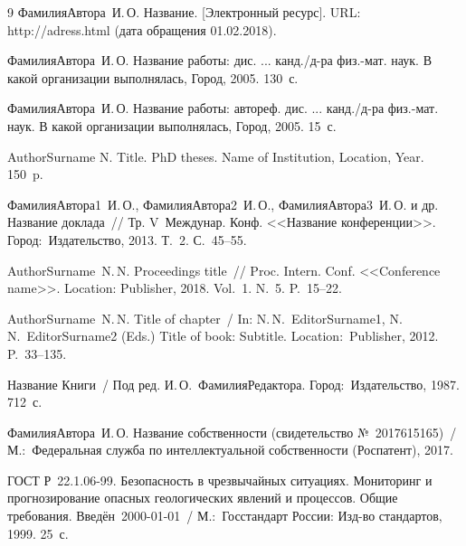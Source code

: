 \documentclass{YM_Likhanova}
\newcommand{\No}{№}
\begin{document}
{\begin{thebibliography}{9}
{\sc ФамилияАвтора~И.\,О.}
Название. [Электронный ресурс]. URL: http://adress.html (дата обращения 01.02.2018).
 
{\sc ФамилияАвтора~И.\,О.}
Название работы: дис. ... канд./д-ра физ.-мат. наук. В какой организации выполнялась, Город, 2005. 130~с.

{\sc ФамилияАвтора~И.\,О.}
Название работы: автореф. дис. ... канд./д-ра физ.-мат. наук. В какой организации выполнялась, Город, 2005. 15~с.

{\sc AuthorSurname N.}
Title. PhD theses. Name of Institution, Location, Year. 150~p.
 
{\sc ФамилияАвтора1~И.\,О., ФамилияАвтора2~И.\,О., ФамилияАвтора3~И.\,О. и др.}
Название доклада~// Тр. V~Междунар. Конф. <<Название конференции>>. Город:~Издательство, 2013. Т.~2. С.~45--55.
 
{\sc AuthorSurname~N.\,N.}
Proceedings title~// Proc. Intern. Conf. <<Conference name>>. Location: Publisher, 2018. Vol.~1. N.~5. P.~15--22.

{\sc AuthorSurname~N.\,N.}
Title of chapter~/ In: N.\,N.~EditorSurname1, N.\,N.~EditorSurname2 (Eds.) Title of book: Subtitle. Location:~Publisher, 2012. P.~33--135.

Название Книги~/ Под ред. И.\,О.~ФамилияРедактора. Город:~Издательство, 1987. 712~с. 

{\sc ФамилияАвтора~И.\,О.}
Название собственности (свидетельство \No~2017615165)~/ М.:~Федеральная служба по интеллектуальной собственности (Роспатент), 2017.

ГОСТ Р~22.1.06-99. Безопасность в чрезвычайных ситуациях. Мониторинг и прогнозирование опасных геологических явлений и процессов. Общие требования. Введён~2000-01-01~/ М.:~Госстандарт России: Изд-во стандартов, 1999. 25~с. 

\end{thebibliography}
} %
\PutItem
\EndDoc
\end{document}

